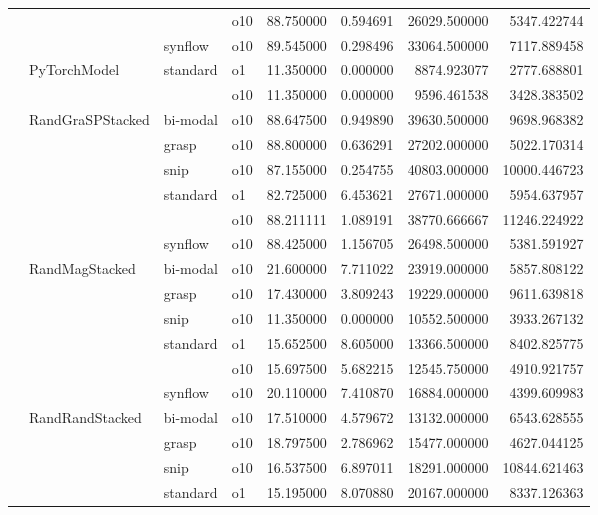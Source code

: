 \begin{longtable}{llllrrrr}
      &     &         & o10 &  88.750000 &   0.594691 &     26029.500000 &   5347.422744 \\
      &     & synflow & o10 &  89.545000 &   0.298496 &     33064.500000 &   7117.889458 \\
      & PyTorchModel & standard & o1 &  11.350000 &   0.000000 &      8874.923077 &   2777.688801 \\
      &     &         & o10 &  11.350000 &   0.000000 &      9596.461538 &   3428.383502 \\
      & RandGraSPStacked & bi-modal & o10 &  88.647500 &   0.949890 &     39630.500000 &   9698.968382 \\
      &     & grasp & o10 &  88.800000 &   0.636291 &     27202.000000 &   5022.170314 \\
      &     & snip & o10 &  87.155000 &   0.254755 &     40803.000000 &  10000.446723 \\
      &     & standard & o1 &  82.725000 &   6.453621 &     27671.000000 &   5954.637957 \\
      &     &         & o10 &  88.211111 &   1.089191 &     38770.666667 &  11246.224922 \\
      &     & synflow & o10 &  88.425000 &   1.156705 &     26498.500000 &   5381.591927 \\
      & RandMagStacked & bi-modal & o10 &  21.600000 &   7.711022 &     23919.000000 &   5857.808122 \\
      &     & grasp & o10 &  17.430000 &   3.809243 &     19229.000000 &   9611.639818 \\
      &     & snip & o10 &  11.350000 &   0.000000 &     10552.500000 &   3933.267132 \\
      &     & standard & o1 &  15.652500 &   8.605000 &     13366.500000 &   8402.825775 \\
      &     &         & o10 &  15.697500 &   5.682215 &     12545.750000 &   4910.921757 \\
      &     & synflow & o10 &  20.110000 &   7.410870 &     16884.000000 &   4399.609983 \\
      & RandRandStacked & bi-modal & o10 &  17.510000 &   4.579672 &     13132.000000 &   6543.628555 \\
      &     & grasp & o10 &  18.797500 &   2.786962 &     15477.000000 &   4627.044125 \\
      &     & snip & o10 &  16.537500 &   6.897011 &     18291.000000 &  10844.621463 \\
      &     & standard & o1 &  15.195000 &   8.070880 &     20167.000000 &   8337.126363 \\

\end{longtable}
